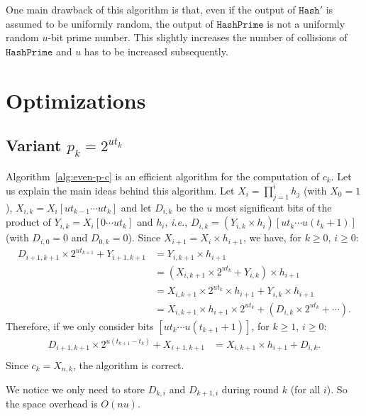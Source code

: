 \documentclass[twoside,envcountsame,runningheads]{llncs}
\newcommand{\Hash}{\ensuremath{\mathtt{Hash}}}
\newcommand{\HashPrime}{\ensuremath{\mathtt{HashPrime}}}
\begin{document}
One main drawback of this algorithm is that, even if the output of $\Hash'$ is assumed to be uniformly random, the output of $\HashPrime$ is not a uniformly random $u$-bit prime number.
This slightly increases the number of collisions of $\HashPrime$ and $u$ has to be increased subsequently.

\section{Optimizations}

\subsection{Variant $p_k = 2^{ut_k}$}
\label{ap:even-p-c}

Algorithm~\ref{alg:even-p-c} is an efficient algorithm for the computation of $c_k$.
Let us explain the main ideas behind this algorithm.
Let $X_i = \prod_{j=1}^i h_j$ (with $X_0 = 1$), $X_{i,k} = X_i[ut_{k-1}\cdots ut_{k}]$ and let $D_{i,k}$ be the $u$ most significant bits of the product of $Y_{i,k} = X_i[0\cdots ut_{k}]$ and $h_i$, {\it i.e.}, $D_{i,k} = (Y_{i,k} \times h_i)[ut_k\cdots u(t_k+1)]$ (with $D_{i,0} = 0$ and $D_{0,k} = 0$).
Since $X_{i+1} = X_i \times h_{i+1}$, we have, for $k \ge 0$, $i \ge 0$:
\begin{align*}
  D_{i+1,k+1} \times 2^{ut_{k+1}} + Y_{i+1,k+1} &= Y_{i,k+1} \times h_{i+1} \\
                 &= (X_{i,k+1} \times 2^{ut_{k}} + Y_{i,k}) \times h_{i+1} \\
                 &= X_{i,k+1} \times 2^{ut_k} \times h_{i+1} + Y_{i,k} \times h_{i+1} \\
                 &= X_{i,k+1}  \times h_{i+1} \times 2^{ut_k} + (D_{i,k} \times 2^{ut_k} + \cdots).
\end{align*}
Therefore, if we only consider bits $[ut_k \cdots u(t_{k+1}+1)]$, for $k\ge1$, $i\ge0$:
\begin{align*}
  D_{i+1,k+1} \times 2^{u(t_{k+1}-t_k)} + X_{i+1,k+1} &= X_{i,k+1} \times h_{i+1} + D_{i,k}. \\
\end{align*}
Since $c_k = X_{n,k}$, the algorithm is correct.

We notice we only need to store $D_{k,i}$ and $D_{k+1,i}$ during round $k$ (for all $i$).
So the space overhead is $O(nu)$.
\end{document}
